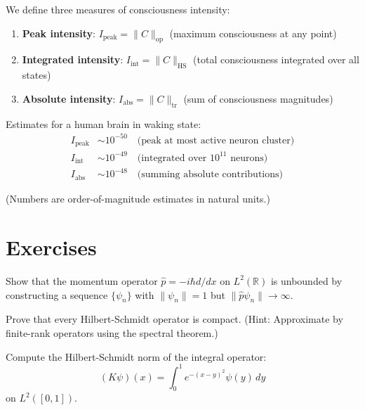 We define three measures of consciousness intensity:

\begin{definition}\label{def:consciousness-intensity-measures}
\begin{enumerate}
\item \textbf{Peak intensity}: $I_{\text{peak}} = \| C \|_{\text{op}}$ (maximum consciousness at any point)
\item \textbf{Integrated intensity}: $I_{\text{int}} = \| C \|_{\text{HS}}$ (total consciousness integrated over all states)
\item \textbf{Absolute intensity}: $I_{\text{abs}} = \| C \|_{\text{tr}}$ (sum of consciousness magnitudes)
\end{enumerate}
\end{definition}

\begin{example}\label{ex:human-brain-norms}
Estimates for a human brain in waking state:
\begin{align}
I_{\text{peak}} &\sim 10^{-50} \quad \text{(peak at most active neuron cluster)}\\
I_{\text{int}} &\sim 10^{-49} \quad \text{(integrated over $10^{11}$ neurons)}\\
I_{\text{abs}} &\sim 10^{-48} \quad \text{(summing absolute contributions)}
\end{align}

(Numbers are order-of-magnitude estimates in natural units.)
\end{example}

\section{Exercises}

\begin{exercise}
Show that the momentum operator $\hat{p} = -i\hbar d/dx$ on $L^2(\mathbb{R})$ is unbounded by constructing a sequence $\{\psi_n\}$ with $\|\psi_n\| = 1$ but $\|\hat{p}\psi_n\| \to \infty$.
\end{exercise}

\begin{exercise}
Prove that every Hilbert-Schmidt operator is compact. (Hint: Approximate by finite-rank operators using the spectral theorem.)
\end{exercise}

\begin{exercise}
Compute the Hilbert-Schmidt norm of the integral operator:
\begin{equation}
(K\psi)(x) = \int_0^1 e^{-(x-y)^2} \psi(y) \, dy
\end{equation}
on $L^2([0,1])$.
\end{exercise}

